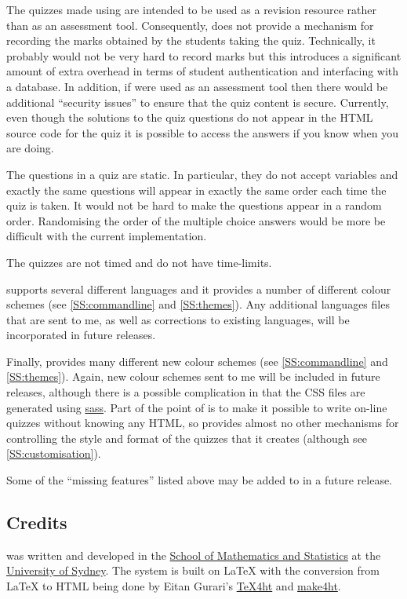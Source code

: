 \documentclass[svgnames]{article}
\begin{document}
    The quizzes made using \WebQuiz are intended to be used as a
    revision resource rather than as an assessment tool. Consequently,
    \WebQuiz does not provide a mechanism for recording the marks
    obtained by the students taking the quiz. Technically, it probably
    would not be very hard to record marks but this introduces a
    significant amount of extra overhead in terms of student
    authentication and interfacing with a database. In addition, if
    \WebQuiz were used as an assessment tool then there would be
    additional ``security issues'' to ensure that the quiz content is
    secure. Currently, even though the solutions to the quiz questions
    do not appear in the HTML source code for the quiz it is possible to
    access the answers if you know when you are doing.

    The questions in a \WebQuiz quiz are static. In particular, they do
    not accept variables and exactly the same questions will appear in
    exactly the same order each time the quiz is taken. It would not be
    hard to make the questions appear in a random order. Randomising the
    order of the multiple choice answers would be more be difficult with
    the current implementation.

    The quizzes are not timed and do not have time-limits.

    \WebQuiz supports several different languages and it
    provides a number of different colour schemes (see
    \autoref{SS:commandline} and \autoref{SS:themes}). Any additional
    languages files that are sent to me, as well as corrections to
    existing languages, will be incorporated in future releases.

    Finally, \WebQuiz provides many different new colour schemes (see
    \autoref{SS:commandline} and \autoref{SS:themes}). Again, new colour
    schemes sent to me will be included in future releases, although
    there is a possible complication in that the \WebQuiz CSS files are
    generated using \href{http://sass-lang.com/}{sass}. Part of the
    point of \WebQuiz is to make it possible to write on-line quizzes
    without knowing any HTML, so \WebQuiz provides almost no other
    mechanisms for controlling the style and format of the quizzes that
    it creates (although see \autoref{SS:customisation}).

    Some of the ``missing features'' listed above may be added to \WebQuiz in a future release.

\subsection{Credits}
    \WebQuiz{} was written and developed in the
    \href{http://www.maths.usyd.edu.au/}{School of Mathematics and
    Statistics} at the \href{http://www.usyd.edu.au/}{University of
    Sydney}.  The system is built on \LaTeX{} with the conversion from
    \LaTeX{} to HTML being done by Eitan Gurari's
    \href{http://www.cis.ohio-state.edu/~gurari/TeXfht/mn.html}{TeX4ht}
    and
    \href{https://github.com/michal-h21/make4ht}{make4ht}.
\end{document}
